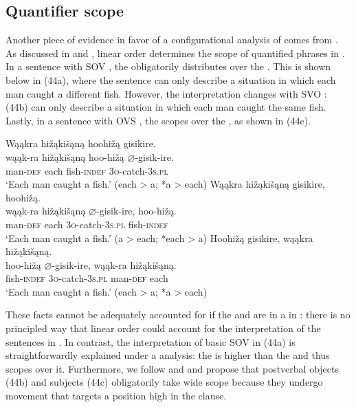 \documentclass[output=paper]{LSP/langsci}
\begin{document}
\subsection{Quantifier scope}

Another piece of evidence in favor of a configurational analysis of  comes from . As discussed in \citet{Johnson2014} and \citet{JohnsonRosen2014}, linear order determines the scope of quantified phrases in . In a sentence with SOV , the  obligatorily distributes over the . This is shown below in (44a), where the sentence can only describe a situation in which each man caught a different fish. However, the interpretation changes with SVO : (44b) can only describe a situation in which each man caught the same fish. Lastly, in a sentence with OVS , the  scopes over the , as shown in (44c).

\begin{exe}
\ex\label{ex:jrs:44}
\begin{xlist}
\ex 
\glll Wąąkra	hi\v{z}ąki\v{s}ąną		hoohi\v{z}ą	gisikire.\\
wąąk-ra		hi\v{z}ąki\v{s}ąną		hoo-hi\v{z}ą	$\varnothing$-gisik-ire. \\
		man-\textsc{def}		each					fish-\textsc{indef}		\textsc{3o}-catch-\textsc{3s.pl} \\
\trans `Each man caught a fish.' (each > a; *a > each)
\ex 
\glll Wąąkra		hi\v{z}ąki\v{s}ąną		gisikire,			hoohi\v{z}ą.\\
wąąk-ra		hi\v{z}ąki\v{s}ąną		$\varnothing$-gisik-ire,	hoo-hi\v{z}ą. \\
		man-\textsc{def}		each					\textsc{3o}-catch-\textsc{3s.pl}		fish-\textsc{indef} \\
\trans `Each man caught a fish.'  (a > each; *each > a)
\ex 
\glll Hoohi\v{z}ą	gisikire,	wąąkra	 hi\v{z}ąki\v{s}ąną.\\
hoo-hi\v{z}ą	$\varnothing$-gisik-ire,		wąąk-ra	hi\v{z}ąki\v{s}ąną. \\
		fish-\textsc{indef}		\textsc{3o}-catch-\textsc{3s.pl}		man-\textsc{def}		each \\
\trans `Each man caught a fish.' (each > a; *a > each)
\end{xlist}
\end{exe}

These facts cannot be adequately accounted for if the  and  are in a  in : there is no principled way that linear order could account for the interpretation of the sentences in . In contrast, the interpretation of basic SOV  in (44a) is straightforwardly explained under a  analysis: the  is higher than the  and thus scopes over it. Furthermore, we follow \citet{Johnson2014} and  \citet{JohnsonRosen2014} and propose that postverbal objects (44b) and subjects (44c) obligatorily take wide scope because they undergo movement that targets a position high in the clause. 
\end{document}
